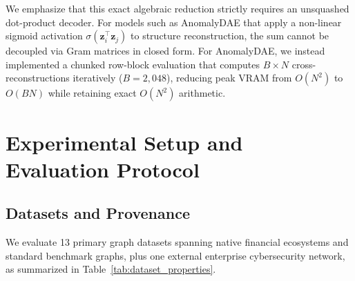 \documentclass[11pt,a4paper]{article}
\begin{document}
We emphasize that this exact algebraic reduction strictly requires an unsquashed dot-product decoder. For models such as AnomalyDAE that apply a non-linear sigmoid activation $\sigma(\mathbf{z}_i^\top \mathbf{z}_j)$ to structure reconstruction, the sum cannot be decoupled via Gram matrices in closed form. For AnomalyDAE, we instead implemented a chunked row-block evaluation that computes $B \times N$ cross-reconstructions iteratively ($B=2,048$), reducing peak VRAM from $O(N^2)$ to $O(B N)$ while retaining exact $O(N^2)$ arithmetic.

\section{Experimental Setup and Evaluation Protocol}
\label{sec:experimental_setup}

\subsection{Datasets and Provenance}
We evaluate 13 primary graph datasets spanning native financial ecosystems and standard benchmark graphs, plus one external enterprise cybersecurity network, as summarized in Table~\ref{tab:dataset_properties}.
\end{document}
